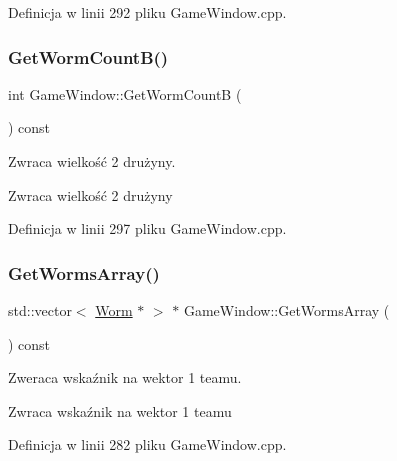 Definicja w linii 292 pliku Game\+Window.\+cpp.

\mbox{\label{class_game_window_a6c6d7e7da6cfc12d33c6da6f84596b15}} 
\subsubsection{\texorpdfstring{Get\+Worm\+Count\+B()}{GetWormCountB()}}
{\footnotesize\ttfamily int Game\+Window\+::\+Get\+Worm\+CountB (\begin{DoxyParamCaption}{ }\end{DoxyParamCaption}) const}



Zwraca wielkość 2 drużyny. 

\begin{DoxyReturn}{Zwraca}
wielkość 2 drużyny 
\end{DoxyReturn}


Definicja w linii 297 pliku Game\+Window.\+cpp.

\mbox{\label{class_game_window_a7535403f5d3ab3ffe22c711665102052}} 
\subsubsection{\texorpdfstring{Get\+Worms\+Array()}{GetWormsArray()}}
{\footnotesize\ttfamily std\+::vector$<$ \mbox{\hyperlink{class_worm}{Worm}} $\ast$ $>$ $\ast$ Game\+Window\+::\+Get\+Worms\+Array (\begin{DoxyParamCaption}{ }\end{DoxyParamCaption}) const}



Zweraca wskaźnik na wektor 1 team\textquotesingle{}u. 

\begin{DoxyReturn}{Zwraca}
wskaźnik na wektor 1 team\textquotesingle{}u 
\end{DoxyReturn}


Definicja w linii 282 pliku Game\+Window.\+cpp.

\mbox{\label{class_game_window_ab9695e10e5a991a9df920911402b9272}} 
